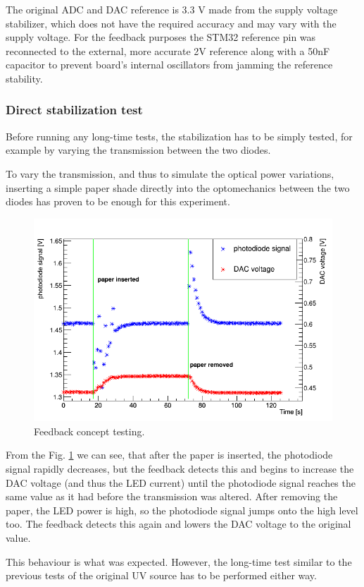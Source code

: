 \par

The original ADC and DAC reference is 3.3 V made from the supply voltage stabilizer, which does not have the required accuracy and may vary with the supply voltage. For the feedback purposes the STM32 reference pin was reconnected to the external, more accurate 2V reference along with a 50nF capacitor to prevent board's internal oscillators from jamming the reference stability.     




\subsubsection{Direct stabilization test}

Before running any long-time tests, the stabilization has to be simply tested, for example by varying the transmission between the two diodes.
\par
To vary the transmission, and thus to simulate the optical power variations, inserting a simple paper shade directly into the optomechanics between the two diodes has proven to be enough for this experiment.

\begin{figure}[H]
 \centering
 \includegraphics[scale=0.5]{./pictures/Stabilizin.png}
 \caption{Feedback concept testing.}
 \label{Feedback testing}
\end{figure}

From the Fig. \ref{Feedback testing} we can see, that after the paper is inserted, the photodiode signal rapidly decreases, but the feedback detects this and begins to increase the DAC voltage (and thus the LED current) until the photodiode signal reaches the same value as it had before the transmission was altered. After removing the paper, the LED power is high, so the photodiode signal jumps onto the high level too. The feedback detects this again and lowers the DAC voltage to the original value. 
\par
This behaviour is what was expected. However, the long-time test similar to the previous tests of the original UV source has to be performed either way. 



